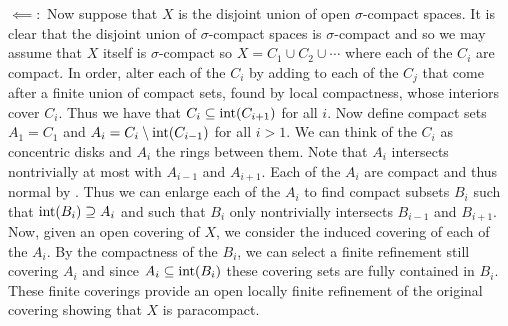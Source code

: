 \documentclass[letterpaper, 11pt, oneside]{book}
\begin{document}
\begin{pf}
  $\impliedby\colon$ Now suppose that $X$ is the disjoint union of open $\sigma$-compact spaces.
  It is clear that the disjoint union of $\sigma$-compact spaces is $\sigma$-compact and so we may assume that $X$ itself is $\sigma$-compact so $X = C_{1} \cup C_{2} \cup \cdots$ where each of the $C_{i}$ are compact.
  In order, alter each of the $C_{i}$ by adding to each of the $C_{j}$ that come after a finite union of compact sets, found by local compactness, whose interiors cover $C_{i}$.
  Thus we have that $C_{i} \subseteq \operatorname{int}(C_{i + 1})$ for all $i$.
  Now define compact sets $A_{1} = C_{1}$ and $A_{i} = C_{i} \setminus \operatorname{int}(C_{i - 1})$ for all $i > 1$.
  We can think of the $C_{i}$ as concentric disks and $A_{i}$ the rings between them.
  Note that $A_{i}$ intersects nontrivially at most with $A_{i - 1}$ and $A_{i + 1}$.
  Each of the $A_{i}$ are compact and thus normal by .
  Thus we can enlarge each of the $A_{i}$ to find compact subsets $B_{i}$ such that $\operatorname{int}(B_{i}) \supseteq A_{i}$ and such that $B_{i}$ only nontrivially intersects $B_{i - 1}$ and $B_{i + 1}$.
  Now, given an open covering of $X$, we consider the induced covering of each of the $A_{i}$.
  By the compactness of the $B_{i}$, we can select a finite refinement still covering $A_{i}$ and since $A_{i} \subseteq \operatorname{int}(B_{i})$ these covering sets are fully contained in $B_{i}$.
  These finite coverings provide an open locally finite refinement of the original covering showing that $X$ is paracompact.
\end{pf}

\clearpage
\end{document}
